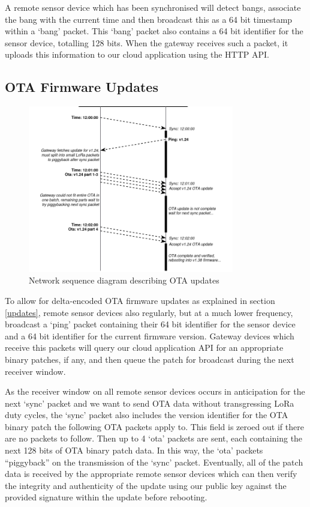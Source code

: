 \documentclass[conference]{IEEEtran}
\begin{document}
A remote sensor device which has been synchronised will detect bangs, associate the bang with the current time and then broadcast this as a 64 bit timestamp within a `bang' packet. This `bang' packet also contains a 64 bit identifier for the sensor device, totalling 128 bits. When the gateway receives such a packet, it uploads this information to our cloud application using the HTTP API.

\subsection{OTA Firmware Updates}

\begin{figure}[ht]
\centerline{\includegraphics[width=90mm]{images/ota.png}}
\caption{Network sequence diagram describing OTA updates}
\label{ota_figure}
\end{figure}

To allow for delta-encoded OTA firmware updates as explained in section \ref{updates}, remote sensor devices also regularly, but at a much lower frequency, broadcast a `ping' packet containing their 64 bit identifier for the sensor device and a 64 bit identifier for the current firmware version. Gateway devices which receive this packets will query our cloud application API for an appropriate binary patches, if any, and then queue the patch for broadcast during the next receiver window.

As the receiver window on all remote sensor devices occurs in anticipation for the next `sync' packet and we want to send OTA data without transgressing LoRa duty cycles, the `sync' packet also includes the version identifier for the OTA binary patch the following OTA packets apply to. This field is zeroed out if there are no packets to follow. Then up to 4 `ota' packets are sent, each containing the next 128 bits of OTA binary patch data. In this way, the `ota' packets ``piggyback'' on the transmission of the `sync' packet. Eventually, all of the patch data is received by the appropriate remote sensor devices which can then verify the integrity and authenticity of the update using our public key against the provided signature within the update before rebooting.
\end{document}
